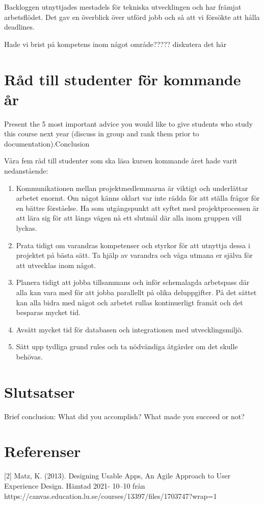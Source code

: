 \documentclass[12pt]{article}
\begin{document}
Backloggen utnyttjades mestadels för tekniska utvecklingen och har främjat arbetsflödet. Det gav en överblick över utförd jobb och så att vi försökte att hålla deadlines. 

Hade vi brist på kompetens inom något område????? diskutera det här


\section{Råd till studenter för kommande år}
Present the 5 most important advice you would like to give students who study this course next year (discuss in group and rank them prior to documentation).Conclusion

Våra fem råd till studenter som ska läsa kursen kommande året hade varit nedanstående:
\begin{enumerate}

\item  Kommunikationen mellan projektmedlemmarna är viktigt och underlättar arbetet enormt. Om något känns oklart var inte rädda för att ställa frågor för en bättre förståelse. Ha som utgångspunkt att syftet med projektprocessen är att lära sig för att längs vägen nå ett slutmål där alla inom gruppen vill lyckas.
\item Prata tidigt om varandras kompetenser och styrkor för att utnyttja dessa i projektet på bästa sätt. Ta hjälp av varandra och våga utmana er själva för att utvecklas inom något. 
\item  Planera tidigt att jobba tillsammans och inför schemalagda arbetspass där alla kan vara med för att jobba parallellt på olika deluppgifter. På det sättet kan alla bidra med något och arbetet rullas kontinuerligt framåt och det besparas mycket tid. 
\item  Avsätt mycket tid för databasen och integrationen med utvecklingsmiljö. 
\item  Sätt upp tydliga grund rules och ta nödvändiga åtgärder om det skulle behövas.        
\end{enumerate}

\section{Slutsatser}
Brief conclusion: What did you accomplish? What made you succeed or not? 

\section{Referenser}
[2] Matz, K. (2013). Designing Usable Apps, An Agile Approach to User Experience Design. Hämtad 2021-
10–10 från https://canvas.education.lu.se/courses/13397/files/1703747?wrap=1






\end{document}
